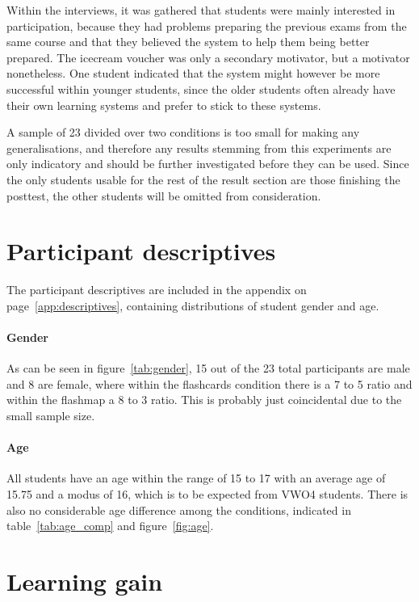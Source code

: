 Within the interviews, it was gathered that students were mainly interested in participation, because they had problems preparing the previous exams from the same course and that they believed the system to help them being better prepared. The icecream voucher was only a secondary motivator, but a motivator nonetheless. One student indicated that the system might however be more successful within younger students, since the older students often already have their own learning systems and prefer to stick to these systems.

A sample of 23 divided over two conditions is too small for making any generalisations, and therefore any results stemming from this experiments are only indicatory and should be further investigated before they can be used. Since the only students usable for the rest of the result section are those finishing the posttest, the other students will be omitted from consideration.

\section{Participant descriptives}

The participant descriptives are included in the  appendix on page~\ref{app:descriptives}, containing distributions of student gender and age.

\paragraph{Gender} As can be seen in figure~\ref{tab:gender}, 15 out of the 23 total participants are male and 8 are female, where within the flashcards condition there is a 7 to 5 ratio and within the flashmap a 8 to 3 ratio. This is probably just coincidental due to the small sample size.

\paragraph{Age} All students have an age within the range of 15 to 17 with an average age of 15.75 and a modus of 16, which is to be expected from VWO4 students. There is also no considerable age difference among the conditions, indicated in table~\ref{tab:age_comp} and figure~\ref{fig:age}.

\section{Learning gain}

